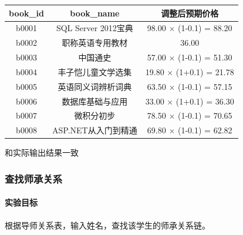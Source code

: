 \documentclass[a4paper]{article}
\begin{document}
\begin{center}
\begin{tabular}{ccc}
\toprule
book\_id & book\_name & 调整后预期价格 \\
\midrule
b0001 & SQL Server 2012宝典 & 98.00 $\times$ (1-0.1) = 88.20 \\
b0002 & 职称英语专用教材 & 36.00 \\
b0003 & 中国通史 & 57.00 $\times$ (1-0.1) = 51.30 \\
b0004 & 丰子恺儿童文学选集 & 19.80 $\times$ (1+0.1) = 21.78 \\
b0005 & 英语同义词辨析词典 & 63.50 $\times$ (1-0.1) = 57.15 \\
b0006 & 数据库基础与应用 & 33.00 $\times$ (1+0.1) = 36.30 \\
b0007 & 微积分初步 & 78.50 $\times$ (1-0.1) = 70.65 \\
b0008 & ASP.NET从入门到精通 & 69.80 $\times$ (1-0.1) = 62.82 \\
\bottomrule
\end{tabular}
\end{center}
和实际输出结果一致
\subsubsection{查找师承关系}

\paragraph{实验目标}
根据导师关系表，输入姓名，查找该学生的师承关系链。
\end{document}
